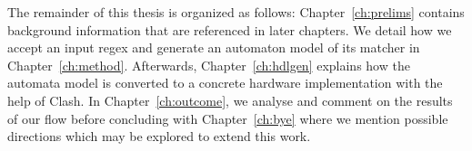 

The remainder of this thesis is organized as follows:
Chapter~\ref{ch:prelims} contains background information that are referenced in
later chapters.
We detail how we accept an input regex and generate an automaton model
of its matcher in Chapter~\ref{ch:method}.
Afterwards, Chapter~\ref{ch:hdlgen} explains how the automata model is converted
to a concrete hardware implementation with the help of Clash.
In Chapter~\ref{ch:outcome}, we analyse and comment on the results of
our flow before concluding with Chapter~\ref{ch:bye} where we mention
possible directions which may be explored to extend this work.


